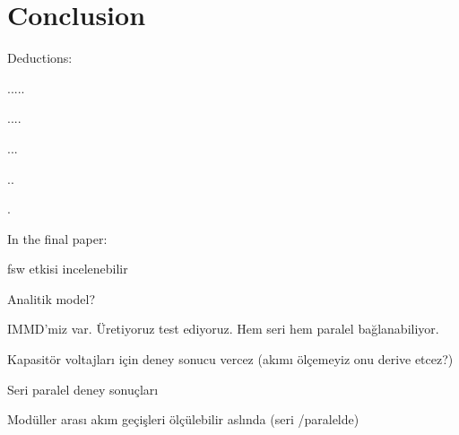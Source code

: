 \section{Conclusion}

Deductions:

.....

....

...

..

.

In the final paper:

fsw etkisi incelenebilir

Analitik model?

IMMD'miz var. Üretiyoruz test ediyoruz. Hem seri hem paralel bağlanabiliyor.

Kapasitör voltajları için deney sonucu vercez (akımı ölçemeyiz onu derive etcez?)

Seri paralel deney sonuçları

Modüller arası akım geçişleri ölçülebilir aslında (seri
/paralelde)
